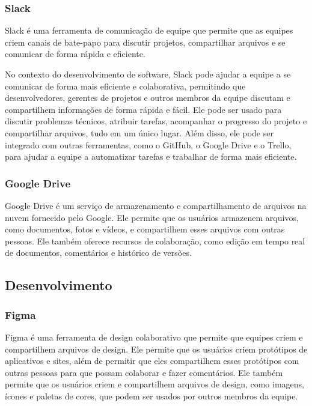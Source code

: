 \subsubsection{Slack}

Slack é uma ferramenta de comunicação de equipe que permite que as equipes criem canais de bate-papo para discutir projetos, compartilhar arquivos e se comunicar de forma rápida e eficiente.

No contexto do desenvolvimento de software, Slack pode ajudar a equipe a se comunicar de forma mais eficiente e colaborativa, permitindo que desenvolvedores, gerentes de projetos e outros membros da equipe discutam e compartilhem informações de forma rápida e fácil. Ele pode ser usado para discutir problemas técnicos, atribuir tarefas, acompanhar o progresso do projeto e compartilhar arquivos, tudo em um único lugar. Além disso, ele pode ser integrado com outras ferramentas, como o GitHub, o Google Drive e o Trello, para ajudar a equipe a automatizar tarefas e trabalhar de forma mais eficiente.

\subsubsection{Google Drive}

Google Drive é um serviço de armazenamento e compartilhamento de arquivos na nuvem fornecido pelo Google. Ele permite que os usuários armazenem arquivos, como documentos, fotos e vídeos, e compartilhem esses arquivos com outras pessoas. Ele também oferece recursos de colaboração, como edição em tempo real de documentos, comentários e histórico de versões.

\subsection{Desenvolvimento}

\subsubsection{Figma}

Figma é uma ferramenta de design colaborativo que permite que equipes criem e compartilhem arquivos de design. Ele permite que os usuários criem protótipos de aplicativos e sites, além de permitir que eles compartilhem esses protótipos com outras pessoas para que possam colaborar e fazer comentários. Ele também permite que os usuários criem e compartilhem arquivos de design, como imagens, ícones e paletas de cores, que podem ser usados por outros membros da equipe.

